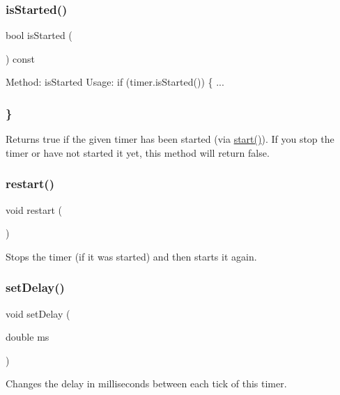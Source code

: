 \subsubsection{\texorpdfstring{is\+Started()}{isStarted()}}
{\footnotesize\ttfamily bool is\+Started (\begin{DoxyParamCaption}{ }\end{DoxyParamCaption}) const}



Method\+: is\+Started Usage\+: if (timer.\+is\+Started()) \{ ... 

\subsubsection*{\} }

Returns true if the given timer has been started (via \mbox{\hyperlink{classGTimer_a60de64d75454385b23995437f1d72669}{start()}}). If you stop the timer or have not started it yet, this method will return false. \mbox{\label{classGTimer_a22ee094ca3f45aa4156b97d34fe678bf}} 
\subsubsection{\texorpdfstring{restart()}{restart()}}
{\footnotesize\ttfamily void restart (\begin{DoxyParamCaption}{ }\end{DoxyParamCaption})}



Stops the timer (if it was started) and then starts it again. 

\mbox{\label{classGTimer_acebfcbc48c6acd460dac117a8f71a92f}} 
\subsubsection{\texorpdfstring{set\+Delay()}{setDelay()}}
{\footnotesize\ttfamily void set\+Delay (\begin{DoxyParamCaption}\item[{double}]{ms }\end{DoxyParamCaption})}



Changes the delay in milliseconds between each tick of this timer. 

